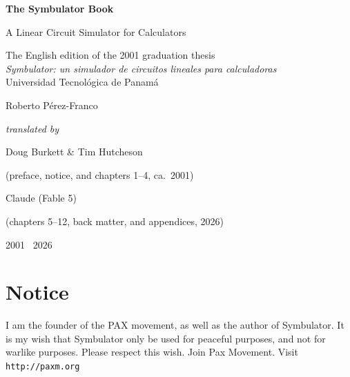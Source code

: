 \documentclass[11pt,oneside]{report}
\newcommand{\code}[1]{\texttt{#1}}
\begin{document}

\begin{titlepage}
\centering
\vspace*{2.6cm}
{\Huge\bfseries The Symbulator Book\par}
\vspace{0.6cm}
{\Large A Linear Circuit Simulator for Calculators\par}
\vspace{0.4cm}
{\normalsize The English edition of the 2001 graduation thesis\\
\emph{Symbulator: un simulador de circuitos lineales para
calculadoras}\\
Universidad Tecnol\'ogica de Panam\'a\par}
\vspace{2.2cm}
{\large Roberto P\'erez-Franco\par}
\vspace{1.6cm}
{\itshape translated by\par}
\vspace{0.25cm}
{\large Doug Burkett \& Tim Hutcheson\par}
{\normalsize (preface, notice, and chapters 1--4, ca.~2001)\par}
\vspace{0.35cm}
{\large Claude (Fable 5)\par}
{\normalsize (chapters 5--12, back matter, and appendices, 2026)\par}
\vfill
{\large 2001 \textperiodcentered\ 2026\par}
\end{titlepage}


\chapter*{Notice}
\thispagestyle{empty}

I am the founder of the PAX movement, as well as the author of
Symbulator. It is my wish that Symbulator only be used for peaceful
purposes, and not for warlike purposes. Please respect this wish.
Join Pax Movement. Visit \code{http://paxm.org}

\vfill
\end{document}
